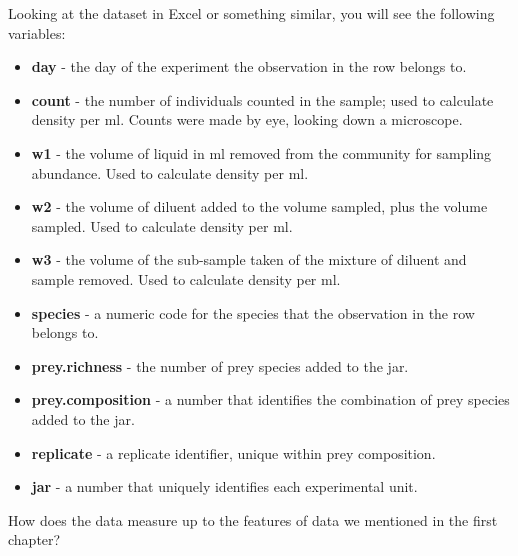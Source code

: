 \documentclass[]{book}
\providecommand{\tightlist}{%
  \setlength{\itemsep}{0pt}\setlength{\parskip}{0pt}}
\begin{document}
Looking at the dataset in Excel or something similar, you will see the following variables:

\begin{itemize}
\tightlist
\item
  \textbf{day} - the day of the experiment the observation in the row belongs to.
\item
  \textbf{count} - the number of individuals counted in the sample; used to calculate density per ml. Counts were made by eye, looking down a microscope.
\item
  \textbf{w1} - the volume of liquid in ml removed from the community for sampling abundance. Used to calculate density per ml.
\item
  \textbf{w2} - the volume of diluent added to the volume sampled, plus the volume sampled. Used to calculate density per ml.
\item
  \textbf{w3} - the volume of the sub-sample taken of the mixture of diluent and sample removed. Used to calculate density per ml.
\item
  \textbf{species} - a numeric code for the species that the observation in the row belongs to.
\item
  \textbf{prey.richness} - the number of prey species added to the jar.
\item
  \textbf{prey.composition} - a number that identifies the combination of prey species added to the jar.
\item
  \textbf{replicate} - a replicate identifier, unique within prey composition.
\item
  \textbf{jar} - a number that uniquely identifies each experimental unit.
\end{itemize}

How does the data measure up to the features of data we mentioned in the first chapter?
\end{document}
